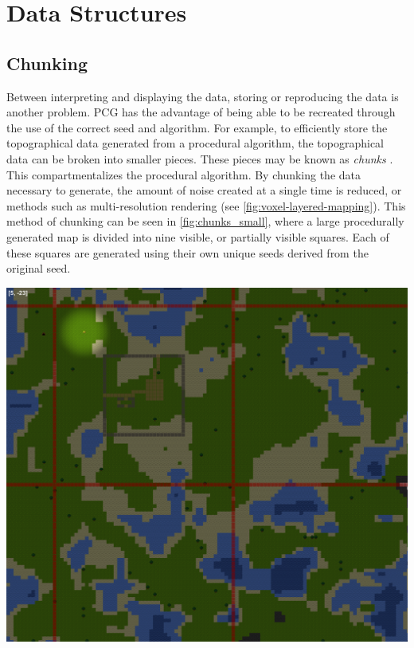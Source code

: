 \documentclass[10pt]{report}
\begin{document}
	\vspace{10pt}
	\let\clearpage\relax
	\chapter{Data Structures} \label{chap:data_structures}
	
		\section{Chunking}
		Between interpreting and displaying the data, storing or reproducing the data is another problem. PCG has the advantage of being able to be recreated through the use of the correct seed and algorithm. For example, to efficiently store the topographical data generated from a procedural algorithm, the topographical data can be broken into smaller pieces. These pieces may be known as \emph{chunks} \cite{tiling}. This compartmentalizes the procedural algorithm. By chunking the data necessary to generate, the amount of noise created at a single time is reduced, or methods such as multi-resolution rendering (see \autoref{fig:voxel-layered-mapping}). This method of chunking can be seen in \autoref{fig:chunks_small}, where a large procedurally generated map is divided into nine visible, or partially visible squares. Each of these squares are generated using their own unique seeds derived from the original seed.
		
		\begin{minipage}{\textwidth}
			\centering
			\includegraphics[scale=.4]{chunks_small}
			\label{fig:chunks_small}
		\end{minipage}
		
\end{document}
